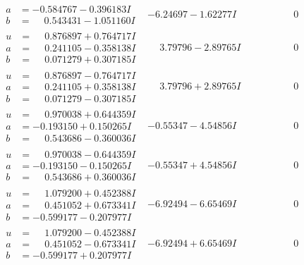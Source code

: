 \documentclass[1p]{elsarticle_modified}
\theoremstyle{definition}
\begin{document}
$$\begin{array}{c|c|c}
\begin{aligned}
a &= -0.584767 - 0.396183 I \\
b &= \phantom{-}0.543431 - 1.051160 I\end{aligned}
 & -6.24697 - 1.62277 I & \phantom{-0.000000 } 0 \\ \hline\begin{aligned}
u &= \phantom{-}0.876897 + 0.764717 I \\
a &= \phantom{-}0.241105 - 0.358138 I \\
b &= \phantom{-}0.071279 + 0.307185 I\end{aligned}
 & \phantom{-}3.79796 - 2.89765 I & \phantom{-0.000000 } 0 \\ \hline\begin{aligned}
u &= \phantom{-}0.876897 - 0.764717 I \\
a &= \phantom{-}0.241105 + 0.358138 I \\
b &= \phantom{-}0.071279 - 0.307185 I\end{aligned}
 & \phantom{-}3.79796 + 2.89765 I & \phantom{-0.000000 } 0 \\ \hline\begin{aligned}
u &= \phantom{-}0.970038 + 0.644359 I \\
a &= -0.193150 + 0.150265 I \\
b &= \phantom{-}0.543686 - 0.360036 I\end{aligned}
 & -0.55347 - 4.54856 I & \phantom{-0.000000 } 0 \\ \hline\begin{aligned}
u &= \phantom{-}0.970038 - 0.644359 I \\
a &= -0.193150 - 0.150265 I \\
b &= \phantom{-}0.543686 + 0.360036 I\end{aligned}
 & -0.55347 + 4.54856 I & \phantom{-0.000000 } 0 \\ \hline\begin{aligned}
u &= \phantom{-}1.079200 + 0.452388 I \\
a &= \phantom{-}0.451052 + 0.673341 I \\
b &= -0.599177 - 0.207977 I\end{aligned}
 & -6.92494 - 6.65469 I & \phantom{-0.000000 } 0 \\ \hline\begin{aligned}
u &= \phantom{-}1.079200 - 0.452388 I \\
a &= \phantom{-}0.451052 - 0.673341 I \\
b &= -0.599177 + 0.207977 I\end{aligned}
 & -6.92494 + 6.65469 I & \phantom{-0.000000 } 0\\

\end{array}$$
\end{document}
